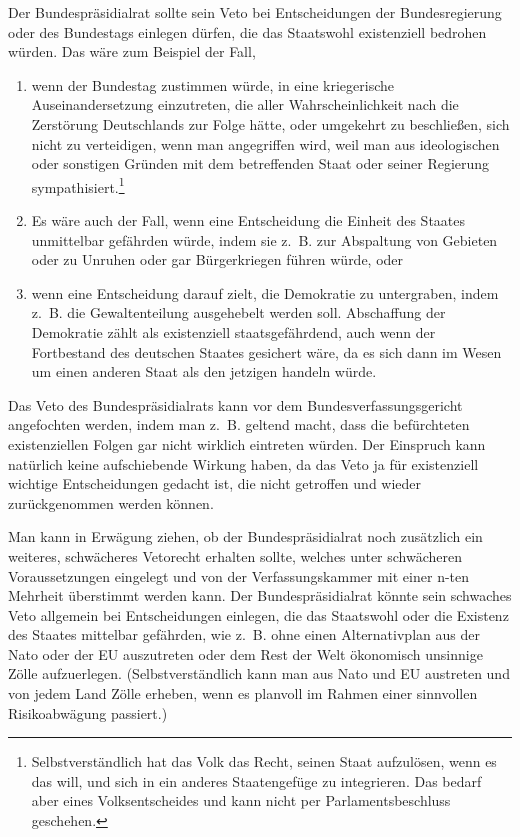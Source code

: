\label{subsubsubsec:vetorechte}
Der Bundespräsidialrat sollte sein Veto bei Entscheidungen der Bundesregierung oder des Bundestags einlegen dürfen, die das Staatswohl existenziell bedrohen würden.
Das wäre zum Beispiel der Fall,
\begin{enumerate}[label=\alph*)]
    \item wenn der Bundestag zustimmen würde, in eine kriegerische Auseinandersetzung einzutreten, die aller Wahrscheinlichkeit nach die Zerstörung Deutschlands zur Folge hätte, oder umgekehrt zu beschließen, sich nicht zu verteidigen, wenn man angegriffen wird, weil man aus ideologischen oder sonstigen Gründen mit dem betreffenden Staat oder seiner Regierung sympathisiert.\footnote{Selbstverständlich hat das Volk das Recht, seinen Staat aufzulösen, wenn es das will, und sich in ein anderes Staatengefüge zu integrieren.
      Das bedarf aber eines Volksentscheides und kann nicht per Parlamentsbeschluss geschehen.}
    \item Es wäre auch der Fall, wenn eine Entscheidung die Einheit des Staates unmittelbar gefährden würde, indem sie z.~B. zur Abspaltung von Gebieten oder zu Unruhen oder gar Bürgerkriegen führen würde, oder
    \item wenn eine Entscheidung darauf zielt, die Demokratie zu untergraben, indem z.~B. die Gewaltenteilung ausgehebelt werden soll.
     Abschaffung der Demokratie zählt als existenziell staatsgefährdend, auch wenn der Fortbestand des deutschen Staates gesichert wäre, da es sich dann im Wesen um einen anderen Staat als den jetzigen handeln würde.
\end{enumerate}

Das Veto des Bundespräsidialrats kann vor dem Bundesverfassungsgericht angefochten werden, indem man z.~B. geltend macht, dass die befürchteten existenziellen Folgen gar nicht wirklich eintreten würden.
Der Einspruch kann natürlich keine aufschiebende Wirkung haben, da das Veto ja für existenziell wichtige Entscheidungen gedacht ist, die nicht getroffen und wieder zurückgenommen werden können.

Man kann in Erwägung ziehen, ob der Bundespräsidialrat noch zusätzlich ein weiteres, schwächeres Vetorecht erhalten sollte, welches unter schwächeren Voraussetzungen eingelegt und von der Verfassungskammer mit einer n-ten Mehrheit überstimmt werden kann.
Der Bundespräsidialrat könnte sein schwaches Veto allgemein bei Entscheidungen einlegen, die das Staatswohl oder die Existenz des Staates mittelbar gefährden, wie z.~B. ohne einen Alternativplan aus der Nato oder der EU auszutreten oder dem Rest der Welt ökonomisch unsinnige Zölle aufzuerlegen.
(Selbstverständlich kann man aus Nato und EU austreten und von jedem Land Zölle erheben, wenn es planvoll im Rahmen einer sinnvollen Risikoabwägung passiert.)

